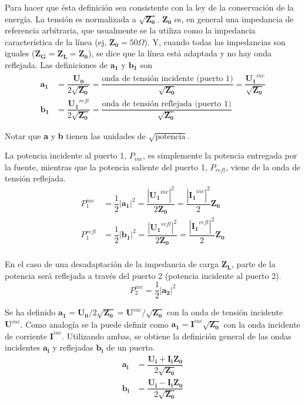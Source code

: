 Para hacer que ésta definición sea consistente con la ley de la conservación de la energía. La tensión es normalizada a $\sqrt{\bm{Z_0}}$. $\bm{Z_0}$ es, en general una impedancia de referencia arbitraria, que usualmente se la utiliza como la impedancia característica de la línea (ej, $\bm{Z_0} = 50 \Omega$). Y, cuando todas las impedancias son iguales ($\bm{Z_G} = \bm{Z_L} = \bm{Z_0}$), se dice que la línea está adaptada y no hay onda reflejada. Las definiciones de $\bm{a_1}$ y $\bm{b_1}$ son
\begin{equation}
\begin{aligned}
  \bm{a_1} &= \dfrac{\bm{U_0}}{2\sqrt{\bm{Z_0}}}= \dfrac{\textrm{onda de tensión incidente (puerto 1)}}{\sqrt{\bm{Z_0}}}=\dfrac{\bm{U_1}^{inc}}{\sqrt{\bm{Z_0}}} \\
  \bm{b_1} &= \dfrac{\bm{U_1}^{refl}}{2\sqrt{\bm{Z_0}}}= \dfrac{\textrm{onda de tensión reflejada (puerto 1)}}{\sqrt{\bm{Z_0}}}
\end{aligned}
\end{equation}

Notar que \textbf{a} y \textbf{b} tienen las unidades de $\sqrt{\textrm{potencia}}$.

La potencia incidente al puerto 1, $P_{inc}$, es simplemente la potencia entregada por la fuente, mientras que la potencia saliente del puerto 1, $P_{refl}$, viene de la onda de tensión reflejada.
\begin{equation}
\begin{aligned}
  P_1^{inc} &= \dfrac{1}{2}|\bm{a_1}|^2= \dfrac{|\bm{U_1}^{inc}|^2}{2\bm{Z_0}}=\dfrac{|\bm{I_1}^{inc}|^2}{2}\bm{Z_0} \\
  P_1^{refl} &= \dfrac{1}{2}|\bm{b_1}|^2= \dfrac{|\bm{U_1}^{refl}|^2}{2\bm{Z_0}}=\dfrac{|\bm{I_1}^{refl}|^2}{2}\bm{Z_0} \\
\end{aligned}
\end{equation}

En el caso de una desadaptación de la impedancia de carga $\bm{Z_L}$, parte de la potencia será reflejada a través del puerto 2 (potencia incidente al puerto 2).
\begin{equation}
P_2^{inc}=\dfrac{1}{2}|\bm{a_2}|^2
\end{equation}

Se ha definido $\bm{a_1} = \bm{U_0}/2\sqrt{\bm{Z_0}} = \bm{U}^{inc}/\sqrt{\bm{Z_0}}$ con la onda de tensión incidente $\bm{U}^{inc}$. Como analogía se la puede definir como $\bm{a_1} = \bm{I}^{inc}\sqrt{\bm{Z_0}}$ con la onda incidente de corriente $\bm{I}^{inc}$. Utilizando ambas, se obtiene la definición general de las ondas incidentes $\bm{a_i}$ y reflejadas $\bm{b_i}$ de un puerto.
\begin{equation}
\begin{aligned}
  \bm{a_i} &= \dfrac{\bm{U_i} + \bm{I_i}\bm{Z_0}}{2\sqrt{\bm{Z_0}}} \\
  \bm{b_i} &= \dfrac{\bm{U_i} - \bm{I_i}\bm{Z_0}}{2\sqrt{\bm{Z_0}}}
\end{aligned}
\label{eq:waves}
\end{equation}

